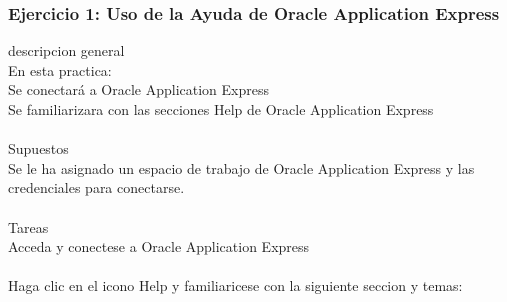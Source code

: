 \documentclass[12pt,letterpaper]{article}
\begin{document}
\subsubsection{Ejercicio 1: Uso de la Ayuda de Oracle Application Express} 
descripcion general  \\
En esta practica:\\
 Se conectará a Oracle Application Express\\
 Se familiarizara con las secciones Help de Oracle Application Express \\
 \\
Supuestos\\
Se le ha asignado un espacio de trabajo de Oracle Application Express y las credenciales para conectarse.\\
\\
Tareas\\
Acceda y conectese a Oracle Application Express
\\
\\
Haga clic en el icono Help y familiaricese con la siguiente seccion y temas: \\
\end{document}
